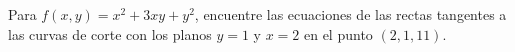Para $f(x, y) = x^2 + 3xy + y^2$, encuentre las ecuaciones de las rectas tangentes a las curvas de corte con los planos $y = 1$ y $x = 2$ en el punto $(2, 1, 11)$.
